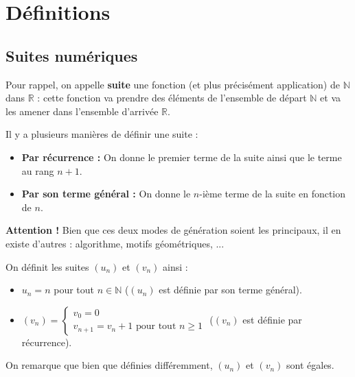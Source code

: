 


	
	
	

	\section{Définitions}

	\subsection{Suites numériques}

	Pour rappel, on appelle \textbf{suite} une fonction (et plus précisément application) de $\mathbb{N}$ dans $\mathbb{R}$ : cette fonction va prendre des éléments de l'ensemble de départ $\mathbb{N}$ et va les amener dans l'ensemble d'arrivée $\mathbb{R}$.

	\begin{formula}[Définition]
		Il y a plusieurs manières de définir une suite :
		\begin{itemize}
			\item \textbf{Par récurrence :} On donne le premier terme de la suite ainsi que le terme au rang $n+1$.
			\item \textbf{Par son terme général :} On donne le $n$-ième terme de la suite en fonction de $n$.
		\end{itemize}
	\end{formula}

	\textbf{Attention !} Bien que ces deux modes de génération soient les principaux, il en existe d'autres : algorithme, motifs géométriques, ...

	\begin{tip}[Exemple]
		On définit les suites $(u_n)$ et $(v_n)$ ainsi :
		\begin{itemize}
			\item $u_n = n$ pour tout $n \in \mathbb{N}$ ($(u_n)$ est définie par son terme général).
			\item $(v_n) = \begin{cases} v_0 = 0 \\ v_{n+1} = v_n + 1 \text{ pour tout } n \geq 1 \end{cases}$ ($(v_n)$ est définie par récurrence).
		\end{itemize}
		On remarque que bien que définies différemment, $(u_n)$ et $(v_n)$ sont égales.
	\end{tip}

